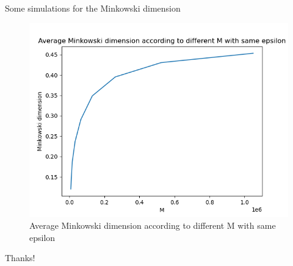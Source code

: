 \documentclass[t]{beamer}
\begin{document}
\begin{frame}{Some simulations for the Minkowski dimension}
    \begin{figure}
        \centering
        \includegraphics[scale=0.50]{differentM_2.png}
        \caption{Average Minkowski dimension according to different M with same epsilon}
        \label{fig:same_eps}
    \end{figure}
\end{frame}

\begin{frame}{Thanks!}
    
\end{frame}
\end{document}
